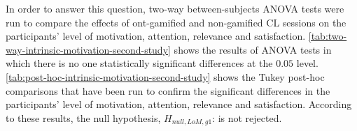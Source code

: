 In order to answer this question, two-way between-subjects ANOVA tests were run to compare the effects of ont-gamified and non-gamified CL sessions on the participants' level of motivation, attention, relevance and satisfaction.
\autoref{tab:two-way-intrinsic-motivation-second-study} shows the results of ANOVA tests in which there is no one statistically significant differences at the $0.05$ level.
\autoref{tab:post-hoc-intrinsic-motivation-second-study} shows the Tukey post-hoc comparisons that have been run to confirm the significant differences in the participants' level of motivation, attention, relevance and satisfaction.
According to these results, 
the null hypothesis, $H_{null,LoM,g1}$:  is not rejected.

